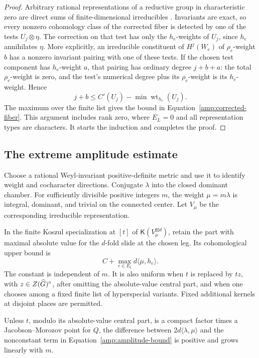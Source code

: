 \begin{proof}
Arbitrary rational representations of a reductive group in
characteristic zero are direct sums of finite-dimensional
irreducibles \cite[Remark~12.53\textup{(a)}, Theorem~22.42, and
Corollary~22.43]{MilneAlgebraicGroups}.
Invariants are exact, so every nonzero cohomology
class of the corrected fiber is detected by one of the tests
$U_j\otimes\eta$.  The correction on that test has only the
$h_e$-weights of $U_j$, since $h_e$ annihilates $\eta$.
More explicitly, an irreducible constituent of $H^j(W_e)$ of
$\rho_e$-weight $b$ has a nonzero invariant pairing with one of
these tests.  If the chosen test component has $h_e$-weight $a$,
that pairing has ordinary degree $j+b+a$: the total $\rho_e$-weight
is zero, and the test's numerical degree plus its $\rho_e$-weight
is its $h_e$-weight.  Hence
\[
 j+b\leq C'(U_j)-\min\operatorname{wt}_{h_e}(U_j).
\]
The maximum over the finite list gives the bound in
Equation~\eqref{amp:corrected-fiber}.  This argument includes rank zero, where $E_L=0$ and all
representation types are characters.  It starts the induction
and completes the proof.
\end{proof}

\subsection{The extreme amplitude estimate}

Choose a rational Weyl-invariant positive-definite metric and use
it to identify weight and cocharacter directions.  Conjugate
$\lambda$ into the closed dominant chamber.  For sufficiently
divisible positive integers $m$, the weight $\mu=m\lambda$ is
integral, dominant, and trivial on the connected center.  Let
$V_\mu$ be the corresponding irreducible representation.

\begin{theorem}
\label{amp:amplitude}
In the finite Koszul specialization at $[t]$ of
$\mathsf K(V_\mu^{\boxtimes d})$, retain the part with maximal
absolute value for the $d$-fold slide at the chosen leg.
Its cohomological upper bound is
\begin{equation}
\label{amp:amplitude-bound}
 C+\max_{e\in E_t}d\langle\mu,h_e\rangle.
\end{equation}
The constant is independent of $m$.
It is also uniform when $t$ is replaced by $tz$, with
$z\in Z(\widehat G)^\circ$, after omitting the absolute-value central
part, and when one chooses among a fixed finite list of
hyperspecial variants.  Fixed additional kernels at disjoint
places are permitted.

Unless $t$, modulo its absolute-value central part, is a compact
factor times a Jacobson--Morozov point for $Q$, the difference
between $2d\langle\lambda,\mu\rangle$ and the nonconstant term
in Equation~\eqref{amp:amplitude-bound} is positive and grows
linearly with $m$.
\end{theorem}

